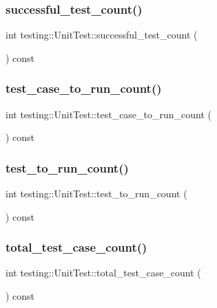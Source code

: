 \subsubsection{\texorpdfstring{successful\_test\_count()}{successful\_test\_count()}}
{\footnotesize\ttfamily int testing\+::\+Unit\+Test\+::successful\+\_\+test\+\_\+count (\begin{DoxyParamCaption}{ }\end{DoxyParamCaption}) const}

\mbox{\label{classtesting_1_1UnitTest_a965248fbe72f9fede5de921b6666943b}} 
\subsubsection{\texorpdfstring{test\_case\_to\_run\_count()}{test\_case\_to\_run\_count()}}
{\footnotesize\ttfamily int testing\+::\+Unit\+Test\+::test\+\_\+case\+\_\+to\+\_\+run\+\_\+count (\begin{DoxyParamCaption}{ }\end{DoxyParamCaption}) const}

\mbox{\label{classtesting_1_1UnitTest_a461f46b2976f135d2a65e8d3def746e9}} 
\subsubsection{\texorpdfstring{test\_to\_run\_count()}{test\_to\_run\_count()}}
{\footnotesize\ttfamily int testing\+::\+Unit\+Test\+::test\+\_\+to\+\_\+run\+\_\+count (\begin{DoxyParamCaption}{ }\end{DoxyParamCaption}) const}

\mbox{\label{classtesting_1_1UnitTest_a93fc8f4eebc3212d06468ad216830ced}} 
\subsubsection{\texorpdfstring{total\_test\_case\_count()}{total\_test\_case\_count()}}
{\footnotesize\ttfamily int testing\+::\+Unit\+Test\+::total\+\_\+test\+\_\+case\+\_\+count (\begin{DoxyParamCaption}{ }\end{DoxyParamCaption}) const}

